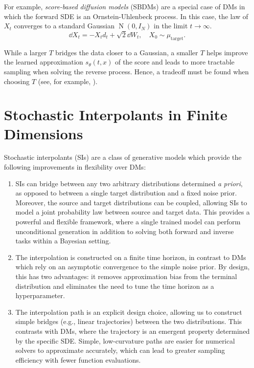 For example, \textit{score-based diffusion models} (SBDMs) are a special case of DMs in which the forward SDE is an Ornstein-Uhlenbeck process. In this case, the law of \(X_{t}\) converges to a standard Gaussian \(\operatorname{N}(0, I_{N})\) in the limit \(t \to \infty\).
\[
  \dd{X_{t}} = - X_{t} d_{t} + \sqrt{2} \dd{W_{t}}, \quad X_{0} \sim \mu_{\text{target}}.
\]

While a larger \(T\) bridges the data closer to a Gaussian, a smaller \(T\) helps improve the learned approximation \(s_{\theta}(t, x)\) of the score and leads to more tractable sampling when solving the reverse process. Hence, a tradeoff must be found when choosing \(T\) (see, for example, \citealp{franzese2023much}).

\section{Stochastic Interpolants in Finite Dimensions}
Stochastic interpolants (SIs) are a class of generative models which provide the following improvements in flexibility over DMs:
\begin{enumerate}
  \item SIs can bridge between any two arbitrary distributions determined \textit{a priori}, as opposed to between a single target distribution and a fixed noise prior. Moreover, the source and target distributions can be coupled, allowing SIs to model a joint probability law between source and target data. This provides a powerful and flexible framework, where a single trained model can perform unconditional generation in addition to solving both forward and inverse tasks within a Bayesian setting.
  \item The interpolation is constructed on a finite time horizon, in contrast to DMs which rely on an asymptotic convergence to the simple noise prior. By design, this has two advantages: it removes approximation bias from the terminal distribution and eliminates the need to tune the time horizon as a hyperparameter.
  \item The interpolation path is an explicit design choice, allowing us to construct simple bridges (e.g., linear trajectories) between the two distributions. This contrasts with DMs, where the trajectory is an emergent property determined by the specific SDE. Simple, low-curvature paths are easier for numerical solvers to approximate accurately, which can lead to greater sampling efficiency with fewer function evaluations.
\end{enumerate}

